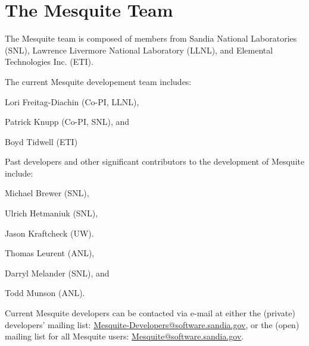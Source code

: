 \chapter{The Mesquite Team}

The Mesquite team is composed of members from Sandia
National Laboratories (SNL), Lawrence Livermore National Laboratory (LLNL), 
and Elemental Technologies Inc. (ETI).\newline
 
\noindent The current Mesquite developement team includes: \newline

Lori Freitag-Diachin (Co-PI, LLNL), \newline

Patrick Knupp (Co-PI, SNL), and \newline

Boyd Tidwell (ETI)  \newline

\noindent Past developers and other significant contributors to
the development of Mesquite include:\newline

Michael Brewer (SNL), \newline

Ulrich Hetmaniuk (SNL), \newline

Jason Kraftcheck (UW).  \newline

Thomas Leurent (ANL), \newline

Darryl Melander (SNL), and \newline

Todd Munson (ANL).  \newline

\noindent Current Mesquite developers can be contacted via e-mail at either 
the (private) developers' mailing list: 
\href{mailto:mesquite-developers@software.sandia.gov}
{Mesquite-Developers@software.sandia.gov},
or the (open) mailing list for all Mesquite users: 
\href{mailto:mesquite@software.sandia.gov}{Mesquite@software.sandia.gov}.
